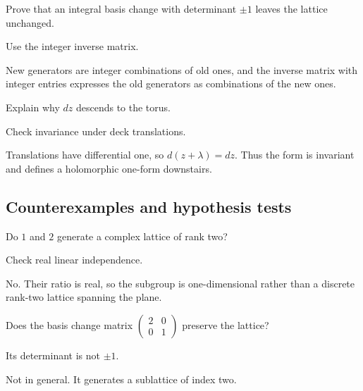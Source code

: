 \begin{exercise}\label{exr:iv27-expand-08}
Prove that an integral basis change with determinant \(\pm1\) leaves the lattice unchanged.
\end{exercise}
\begin{hint}
Use the integer inverse matrix.
\end{hint}
\begin{solution}
New generators are integer combinations of old ones, and the inverse matrix with integer entries expresses the old generators as combinations of the new ones.
\end{solution}

\begin{exercise}\label{exr:iv27-expand-09}
Explain why \(dz\) descends to the torus.
\end{exercise}
\begin{hint}
Check invariance under deck translations.
\end{hint}
\begin{solution}
Translations have differential one, so \(d(z+\lambda)=dz\). Thus the form is invariant and defines a holomorphic one-form downstairs.
\end{solution}

\subsection*{Counterexamples and hypothesis tests}

\begin{exercise}\label{exr:iv27-expand-10}
Do \(1\) and \(2\) generate a complex lattice of rank two?
\end{exercise}
\begin{hint}
Check real linear independence.
\end{hint}
\begin{solution}
No. Their ratio is real, so the subgroup is one-dimensional rather than a discrete rank-two lattice spanning the plane.
\end{solution}

\begin{exercise}\label{exr:iv27-expand-11}
Does the basis change matrix \(\begin{pmatrix}2&0\\0&1\end{pmatrix}\) preserve the lattice?
\end{exercise}
\begin{hint}
Its determinant is not \(\pm1\).
\end{hint}
\begin{solution}
Not in general. It generates a sublattice of index two.
\end{solution}

